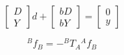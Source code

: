 \documentclass{article}
\begin{document}
\[ \begin{bmatrix} D \\ Y \end{bmatrix} d + \begin{bmatrix} bD \\ bY \end{bmatrix} = \begin{bmatrix} 0 \\ y \end{bmatrix} \]
\pagebreak

\[ {}^Bf_B = -{}^B T_A {}^A f_B \]
\pagebreak
\end{document}
